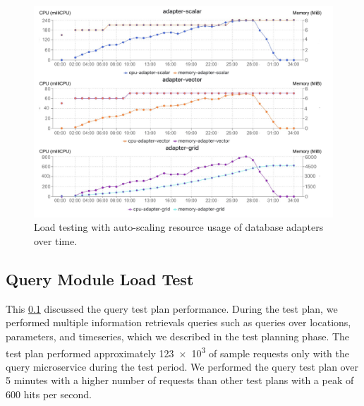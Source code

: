 \begin{figure}[htp]
    \centering
    \includegraphics[width=1.0\textwidth]{results/obs/all_auto/obs_all_auto_15m_adapter_dbs_res.pdf}
    \caption{Load testing with auto-scaling resource usage of database adapters over time.}
    \label{fi:obs_all_auto_15m_adapter_dbs_res}
\end{figure}


\subsection{Query Module Load Test}
\label{subse:obs_test_plan_query_15min}

This \cref{subse:obs_test_plan_query_15min} discussed the query test plan performance. During the test plan, we performed multiple information retrievals queries such as queries over locations, parameters, and timeseries, which we described in the test planning phase. The test plan performed approximately \num{123e3} of sample requests only with the query microservice during the test period. We performed the query test plan over 5 minutes with a higher number of requests than other test plans with a peak of 600 hits per second.

